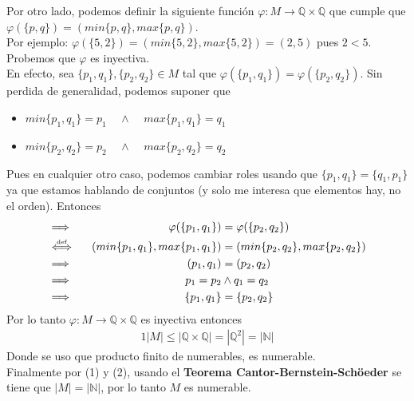 \documentclass[letterpaper,12pt]{article}
\newcommand\myarrow{\mathrel{\overset{\makebox[0pt]{\mbox{\tiny def}}}{\Longleftrightarrow}}}
\newcommand{\Q}{\mathbb Q}
\newcommand{\N}{\mathbb N}
\theoremstyle{plain}
\begin{document}
\begin{enumerate}[a)]
\begin{itemize}
            Por otro lado, podemos definir la siguiente función $\varphi: M \to \Q \times \Q$ que cumple que $\varphi(\{p,q\})=(min\{p,q\},max\{p,q\})$. \\
            Por ejemplo: $\varphi(\{5,2\})=(min\{5,2\},max\{5,2\})=(2,5)$ pues $2<5$.\\[5mm]
            Probemos que $\varphi$ es inyectiva.\\
            En efecto, sea $\{p_1,q_1\}, \{p_2,q_2\} \in M$ tal que $\varphi(\{p_1,q_1\})=\varphi(\{p_2,q_2\} ) $. Sin perdida de generalidad, podemos suponer que 
            \begin{itemize}
                \item $min\{p_1,q_1\}=p_1 ~~~~~ \land ~~~~~ max\{p_1,q_1\}=q_1$
                \item $min\{p_2,q_2\}=p_2 ~~~~~ \land ~~~~~ max\{p_2,q_2\}=q_2$
            \end{itemize}
            Pues en cualquier otro caso, podemos cambiar roles usando que $\{p_1,q_1\}=\{q_1,p_1 \}$ ya que estamos hablando de conjuntos (y solo me interesa que elementos hay, no el orden). Entonces 
             \begin{alignat}{2}
                &\Longrightarrow\quad &\varphi(\{p_1,q_1\})  &= \varphi(\{p_2,q_2\})\notag\\ 
                &\myarrow  &(min\{p_1,q_1\},max\{p_1,q_1\}) &= (min\{p_2,q_2\},max\{p_2,q_2\})\notag\\  
                &\Longrightarrow & (p_1,q_1) &= (p_2,q_2) \notag\\
                &\Longrightarrow &p_1=p_2 & \land  q_1=q_2 \notag\\
                &\Longrightarrow & \{p_1,q_1\} &=\{p_2,q_2\} \notag
            \end{alignat}
            Por lo tanto $\varphi : M \to \Q \times \Q$ es inyectiva entonces 
             \begin{alignat}{1}
                 |M|\leq|\Q \times \Q|=|\Q^{2}|=|\N|
             \end{alignat}
             Donde se uso que producto finito de numerables, es numerable.\\ Finalmente por (1) y (2), usando el \textbf{Teorema Cantor-Bernstein-Schöeder} se tiene que $|M|=|\N|$, por lo tanto $M$ es numerable.
        \end{itemize}
        

\end{enumerate}
\end{document}
